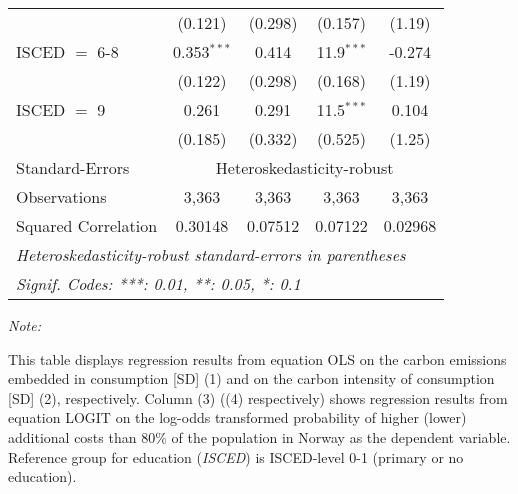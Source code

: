\begin{table}[htbp!]
\begin{adjustbox}{width = 1\textwidth, max height = 0.95\textheight, center}
\begin{threeparttable}[b]
\begin{tabular}{lcccc}
                                 & (0.121)            & (0.298)            & (0.157)        & (1.19)\\   
            ISCED $=$ 6-8        & 0.353$^{***}$      & 0.414              & 11.9$^{***}$   & -0.274\\   
                                 & (0.122)            & (0.298)            & (0.168)        & (1.19)\\   
            ISCED $=$ 9          & 0.261              & 0.291              & 11.5$^{***}$   & 0.104\\   
                                 & (0.185)            & (0.332)            & (0.525)        & (1.25)\\   
            \midrule 
            Standard-Errors & \multicolumn{4}{c}{Heteroskedasticity-robust} \\ 
            Observations         & 3,363              & 3,363              & 3,363          & 3,363\\  
            Squared Correlation  & 0.30148            & 0.07512            & 0.07122        & 0.02968\\  
            \midrule \midrule
            \multicolumn{5}{l}{\emph{Heteroskedasticity-robust standard-errors in parentheses}}\\
            \multicolumn{5}{l}{\emph{Signif. Codes: ***: 0.01, **: 0.05, *: 0.1}}\\
         \end{tabular}
         
         \begin{tablenotes}\item \medskip \textit{Note:}
            \item This table displays regression results from equation OLS on the carbon emissions embedded in consumption [SD] (1) and on the carbon intensity of consumption [SD] (2), respectively. 
                                      Column (3) ((4) respectively) shows regression results from equation LOGIT on the log-odds transformed probability of higher (lower) additional costs than 80\% of the population in Norway as the dependent variable. Reference group for education (\textit{ISCED}) is ISCED-level 0-1 (primary or no education).
         \end{tablenotes}
      \end{threeparttable}
   \end{adjustbox}
\end{table}


